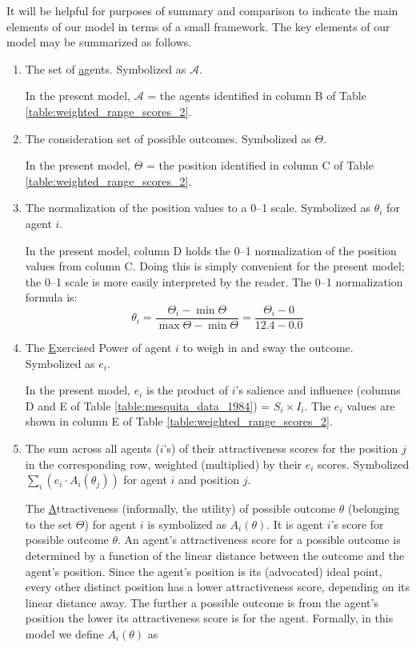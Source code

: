 It will be helpful for purposes of summary and comparison to indicate the main elements of our model in terms of a small framework.
The key elements of our model may be summarized as follows.
\begin{enumerate}
  \renewcommand{\theenumi}{\roman{enumi}}

\item The set of \underline{a}gents. Symbolized as $\mathcal{A}$.

 
 In the present model, $\mathcal{A}$ = the agents identified in column B of Table \ref{table:weighted_range_scores_2}.
 
\item The consideration set of possible outcomes. Symbolized as $\Theta$.

In the present model, $\Theta$ = the   {position} identified in column C of Table \ref{table:weighted_range_scores_2}.

\item The normalization of the   {position} values to a 0--1 scale. Symbolized as $\theta_i$ for agent $i$.


In the present model, column D holds the 0--1 normalization of the   {position} values from column C.  Doing this is simply convenient for the present model; the 0--1 scale is more easily interpreted by the reader. The 0--1 normalization formula is:
\begin{equation}
\theta_i = \frac{\Theta_i - \min\Theta}{\max{\Theta}-\min{\Theta}} = \frac{\Theta_i - 0}{12.4 - 0.0}
\end{equation}

\item The \underline{E}xercised Power of agent $i$ to weigh in and sway the outcome. Symbolized as $e_i$.  %

In the present model, $e_i$ is the product of $i$'s   {salience} and   {influence} (columns D and E of Table 
\ref{table:mesquita_data_1984}) = $S_i\times I_i$. The $e_i$ values are shown in column E of Table \ref{table:weighted_range_scores_2}. 



\item  The sum across all agents ($i$'s) of their   {attractiveness} scores for the   {position} $j$ in the corresponding row, weighted (multiplied) by their $e_i$ scores. Symbolized $\sum_i (e_i\cdot A_i(\theta_j))$ for agent $i$ and position $j$.

The \underline{A}ttractiveness (informally, the utility) of possible outcome $\theta$ (belonging to the set $\Theta$) for agent $i$ is symbolized as $A_i(\theta)$. It is agent $i$'s score for possible outcome $\theta$. An agent's   {attractiveness} score for a possible outcome is determined by a function of the linear distance between the outcome and the agent's   {position}. Since the agent's   {position} is its (advocated) ideal point, every other distinct position has a lower   {attractiveness} score, depending on its linear distance away. The further a possible outcome is from the agent's   {position} the lower its   {attractiveness} score is for the agent. Formally, in this model we define $A_i(\theta)$ as


\end{enumerate}
